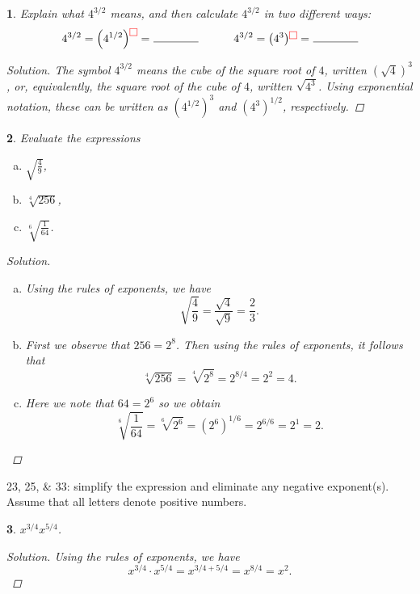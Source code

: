 \documentclass[12pt]{amsart}
\newtheorem{thm}{}
\begin{document}
\setcounter{thm}{3}
\begin{thm}
  Explain what $4^{3/2}$ means, and then calculate $4^{3/2}$ in two different ways:
  $$4^{3/2} = \left(4^{1/2}\right)^{{\color{red}\fbox{}}} =\ \line(1,0){40} \hspace{10mm} 4^{3/2} = \left(4^3\right)^{{\color{red}\fbox{}}} =\ \line(1,0){40}$$
  
  \begin{proof}[Solution]
    The symbol $4^{3/2}$ means the cube of the square root of $4$, written $(\sqrt{4})^3$, or, equivalently, the square root of the cube of $4$, written $\sqrt{4^3}$.
    Using exponential notation, these can be written as $\left(4^{1/2}\right)^3$ and $\left(4^3\right)^{1/2}$, respectively.
  \end{proof}
\end{thm}

\setcounter{thm}{16}
\begin{thm}
  Evaluate the expressions
  \begin{enumerate}[(a)]
  \item
    $\sqrt{\frac{4}{9}}$,
  \item
    $\sqrt[4]{256}$,
  \item
    $\sqrt[6]{\frac{1}{64}}$.
  \end{enumerate}
  
  \begin{proof}[Solution]
    \begin{enumerate}[(a)]
    \item
      Using the rules of exponents, we have
      $$\sqrt{\frac{4}{9}} = \frac{\sqrt{4}}{\sqrt{9}} = \frac{2}{3}.$$
    \item
      First we observe that $256 = 2^8$.
      Then using the rules of exponents, it follows that
      $$\sqrt[4]{256} = \sqrt[4]{2^8} = 2^{8/4} = 2^2 = 4.$$
    \item
      Here we note that $64 = 2^6$ so we obtain
      $$\sqrt[6]{\frac{1}{64}} = \sqrt[6]{2^6} = \left(2^6\right)^{1/6} = 2^{6/6} = 2^1 = 2.$$
    \end{enumerate}
  \end{proof}
\end{thm}

23, 25, \& 33: simplify the expression and eliminate any negative exponent(s).
Assume that all letters denote positive numbers.
\setcounter{thm}{22}
\begin{thm}
  $\displaystyle{x^{3/4}x^{5/4}}$.
  
  \begin{proof}[Solution]
    Using the rules of exponents, we have
    $$x^{3/4}\cdot x^{5/4} = x^{3/4 + 5/4} = x^{8/4} = x^2.$$
  \end{proof}
\end{thm}
\end{document}
